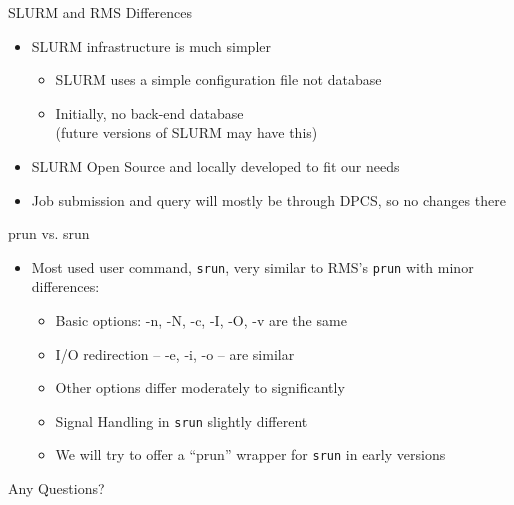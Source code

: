 \documentclass[%
letterpaper,
pdf,
slideColor,
alienglow
]{prosper}
\begin{document}
%
%
\begin{slide}{SLURM and RMS Differences}
\raggedright
\begin{itemize}
\item SLURM infrastructure is much simpler
  \begin{itemize}
  \item SLURM uses a simple configuration file not database
  \item Initially, no back-end database \\
        (future versions of SLURM may have this)
  \end{itemize}
\item SLURM Open Source and locally developed to fit our needs
\item Job submission and query will mostly be through DPCS, so no changes
      there
\end{itemize}
\end{slide}

%
%
\begin{slide}{prun vs. srun}
\raggedright
\begin{itemize}
\item Most used user command, {\tt srun}, very similar to RMS's {\tt prun}
      with minor differences:
  \begin{itemize}
  \item Basic options: -n,  -N, -c, -I, -O, -v are the same
  \item I/O redirection --  -e, -i, -o -- are similar
  \item Other options differ moderately to significantly
  \item Signal Handling in {\tt srun} slightly different
  \item We will try to offer a ``prun'' wrapper for {\tt srun} in early versions
  \end{itemize}
\end{itemize}
\end{slide}

%
\begin{slide}{Any Questions?}
\hfill \hfill {} \hfill
\end{slide}
\end{document}
